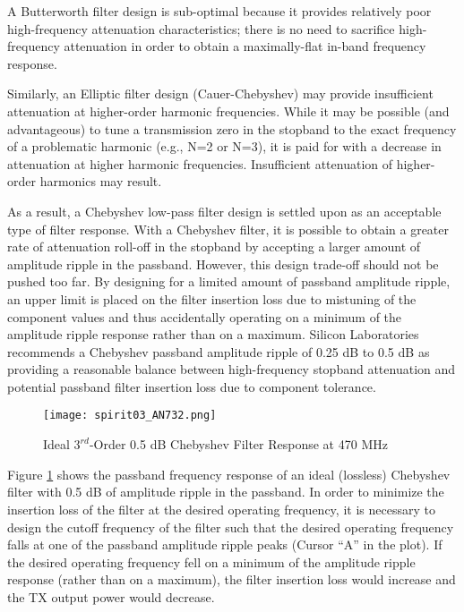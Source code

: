         A Butterworth filter design is sub-optimal because it provides relatively poor high-frequency 
        attenuation characteristics; there is no need to sacrifice high-frequency attenuation in order to 
        obtain a maximally-flat in-band frequency response.
        
        Similarly, an Elliptic filter design (Cauer-Chebyshev) may provide insufficient attenuation at 
        higher-order harmonic frequencies. While it may be possible (and advantageous) to tune a 
        transmission zero in the stopband to the exact frequency of a problematic harmonic (e.g., N=2 or 
        N=3), it is paid for with a decrease in attenuation at higher harmonic frequencies. Insufficient 
        attenuation of higher-order harmonics may result.
        
        As a result, a Chebyshev low-pass filter design is settled upon as an acceptable type of filter 
        response. With a Chebyshev filter, it is possible to obtain a greater rate of attenuation roll-off 
        in the stopband by accepting a larger amount of amplitude ripple in the passband. However, this 
        design trade-off should not be pushed too far. By designing for a limited amount of passband 
        amplitude ripple, an upper limit is placed on the filter insertion loss due to mistuning of the 
        component values and thus accidentally operating on a minimum of the amplitude ripple response 
        rather than on a maximum. Silicon Laboratories recommends a Chebyshev passband amplitude ripple of 
        0.25 dB to 0.5 dB as providing a reasonable balance between high-frequency stopband attenuation and 
        potential passband filter insertion loss due to component tolerance.
       
        \begin{figure}[ht!]  %
          \centering
          \texttt{[image: spirit03\_AN732.png]}
          \caption{ Ideal \(3^{rd}\)-Order 0.5 dB Chebyshev Filter Response at 470 MHz}
          \label{EXP001:fig_spirit03}
        \end{figure} 
        
        Figure \ref{EXP001:fig_spirit03} shows the passband frequency response of an ideal (lossless) 
        Chebyshev filter with 0.5 dB of amplitude ripple in the passband. In order to minimize the 
        insertion loss of the filter at the desired operating frequency, it is necessary to design the 
        cutoff frequency of the filter such that the desired operating frequency falls at one of the 
        passband amplitude ripple peaks (Cursor “A” in the plot). If the desired operating frequency fell 
        on a minimum of the amplitude ripple response (rather than on a maximum), the filter insertion loss 
        would increase and the TX output power would decrease.
        
